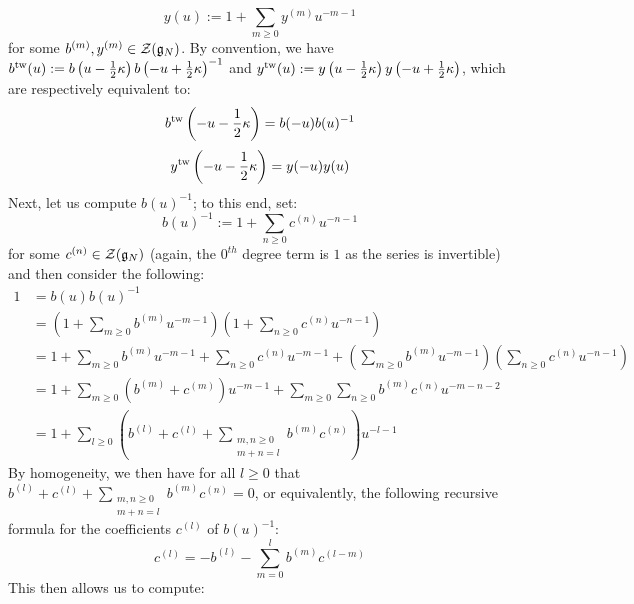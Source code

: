             $$y(u) := 1 + \sum_{m \geq 0} y^{(m)} u^{-m - 1}$$
        for some $b^{(m)}, y^{(m)} \in \mathcal{Z}(\mathfrak{g}_N)$. By convention, we have $b^{\mathrm{tw}}(u) := b\left( u - \frac12 \kappa \right) b\left( -u + \frac12 \kappa \right)^{-1}$ and $y^{\mathrm{tw}}(u) := y\left( u - \frac12 \kappa \right) y\left( -u + \frac12 \kappa \right)$, which are respectively equivalent to:
            $$b^{\mathrm{tw}}\left( -u - \frac12 \kappa \right) = b(-u) b(u)^{-1}$$
            $$y^{\mathrm{tw}}\left( -u - \frac12 \kappa \right) = y(-u) y(u)$$
        Next, let us compute $b(u)^{-1}$; to this end, set:
            $$b(u)^{-1} := 1 + \sum_{n \geq 0} c^{(n)} u^{-n - 1}$$
        for some $c^{(n)} \in \mathcal{Z}(\mathfrak{g}_N)$ (again, the $0^{th}$ degree term is $1$ as the series is invertible) and then consider the following:
            $$
                \begin{aligned}
                    1 & = b(u) b(u)^{-1}
                    \\
                    & = \left( 1 + \sum_{m \geq 0} b^{(m)} u^{-m - 1} \right) \left( 1 + \sum_{n \geq 0} c^{(n)} u^{-n - 1} \right)
                    \\
                    & = 1 + \sum_{m \geq 0} b^{(m)} u^{-m - 1} + \sum_{n \geq 0} c^{(n)} u^{-m - 1} + \left( \sum_{m \geq 0} b^{(m)} u^{-m - 1} \right) \left( \sum_{n \geq 0} c^{(n)} u^{-n - 1} \right)
                    \\
                    & = 1 + \sum_{m \geq 0} ( b^{(m)} + c^{(m)} ) u^{-m - 1} + \sum_{m \geq 0} \sum_{n \geq 0} b^{(m)} c^{(n)} u^{-m - n - 2}
                    \\
                    & = 1 + \sum_{l \geq 0} \left( b^{(l)} + c^{(l)} + \sum_{ \substack{m, n \geq 0 \\ m + n = l} } b^{(m)} c^{(n)} \right) u^{-l - 1}
                \end{aligned}
            $$
        By homogeneity, we then have for all $l \geq 0$ that $b^{(l)} + c^{(l)} + \sum_{ \substack{m, n \geq 0 \\ m + n = l} } b^{(m)} c^{(n)} = 0$, or equivalently, the following recursive formula for the coefficients $c^{(l)}$ of $b(u)^{-1}$:
            $$c^{(l)} = -b^{(l)} - \sum_{m = 0}^l b^{(m)} c^{(l - m)}$$
        This then allows us to compute:
